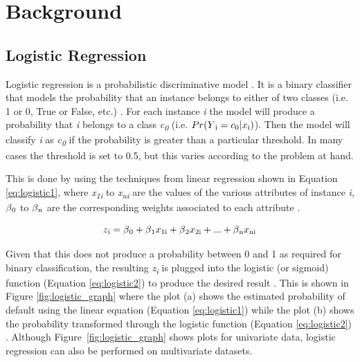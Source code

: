 \documentclass{article}[paper=a4,pagesize=auto,10pt]
\begin{document}
\section{Background}
\label{Background}

\subsection{Logistic Regression} \label{Logistic Regression}

Logistic regression is a probabilistic discriminative model \cite{bishop2006}.  It is a binary classifier that models the probability that an instance belongs to either of two classes (i.e. 1 or 0, True or False, etc.) \cite{james2013introduction}.  For each instance \textit{i} the model will produce a probability that \textit{i} belongs to a class \textit{c\textsubscript{0}} (i.e. $Pr(Y\textsubscript{i} = c\textsubscript{0}|x\textsubscript{i})$).  Then the model will classify \textit{i} as \textit{c\textsubscript{0}} if the probability is greater than a particular threshold.  In many cases the threshold is set to 0.5, but this varies according to the problem at hand. \medskip

This is done by using the techniques from linear regression shown in Equation \ref{eq:logistic1}, where \textit{x\textsubscript{1i}} to \textit{x\textsubscript{ni}} are the values of the various attributes of instance \textit{i}, $\beta\textsubscript{0}$ to $\beta\textsubscript{n}$ are the corresponding weights associated to each attribute \cite{sammut2017encyclopedia}.

\begin{equation}\label{eq:logistic1}
	z\textsubscript{i} = \beta\textsubscript{0} + \beta\textsubscript{1}x\textsubscript{1i} + \beta\textsubscript{2}x\textsubscript{2i} + ... + \beta\textsubscript{n}x\textsubscript{ni}
\end{equation}\smallskip

Given that this does not produce a probability between 0 and 1 as required for binary classification, the resulting \textit{z\textsubscript{i}} is plugged into the logistic (or sigmoid) function (Equation \ref{eq:logistic2}) to produce the desired result \cite{sammut2017encyclopedia}.  This is shown in Figure \ref{fig:logistic_graph} where the plot (a) shows the estimated probability of default using the linear equation (Equation \ref{eq:logistic1}) while the plot (b) shows the probability transformed through the logistic function (Equation \ref{eq:logistic2}) \cite{james2013introduction}. Although Figure~\ref{fig:logistic_graph} shows plots for univariate data, logistic regression can also be performed on multivariate datasets.
\end{document}
